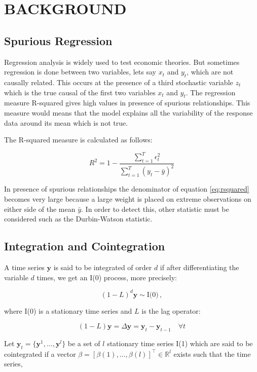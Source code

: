 \section{\uppercase{Background}}
\label{sec:background}
\noindent

\subsection{Spurious Regression}

Regression analysis is widely used to test economic theories. But sometimes
regression is done between two variables, lets say $x_t$ and $y_t$, which are
not causally related. This occurs at the presence of a third stochastic variable
$z_t$ which is the true causal of the first two variables $x_t$ and $y_t$. The
regression measure R-squared gives high values in presence of spurious
relationships. This measure would means that the model explains all the
variability of the response data around its mean which is not true. 

The R-squared measure is calculated as follows:

\begin{equation}
\label{eq:rsquared}
R^2 = 1 - \frac{\sum_{t=1}^T \epsilon_t^2}{\sum_{t=1}^T(y_t - \bar{y})^2}
\end{equation}

In presence of spurious relationships the denominator of equation
\ref{eq:rsquared} becomes very large because a large weight is placed on extreme
observations on either side of the mean $\bar{y}$.
In order to detect this, other statistic must be considered such as the
Durbin-Watson statistic.


\subsection{Integration and Cointegration}
A time series $\mathbf{y}$ is said to be integrated of order $d$ if after
differentiating the variable $d$ times, we get an I(0) process, more precisely:

\[
(1-L)^d \mathbf{y} \sim \text{I(0)} \, ,
\]

\noindent where I(0) is a stationary time series and $L$ is the lag operator:

\[
(1-L)\mathbf{y} = \Delta \mathbf{y}=\mathbf{y}_t  -\mathbf{y}_{t-1} \quad \forall t
\]

Let $\mathbf{y}_t = \{\mathbf{y}^1, \dots, \mathbf{y}^l\}$ be a set of $l$
stationary time series I(1) which are said to be cointegrated if a vector
$\beta=[\beta(1),\dots,\beta(l)]^\top \in \mathbb{R}^l$  exists such that the
time series,

